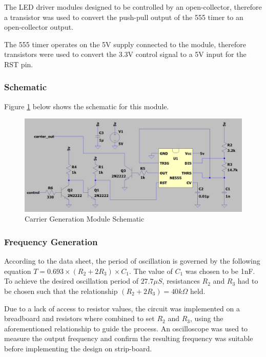 The LED driver modules designed to be controlled by an open-collector, therefore a transistor was used to convert the push-pull output of the 555 timer to an open-collector output.

The 555 timer operates on the 5V supply connected to the module, therefore transistors were used to convert the 3.3V control signal to a 5V input for the RST pin.

\subsubsection{Schematic}
Figure \ref{fig:schematic_carrier_generation} below shows the schematic for this module.

\begin{figure}[H]
	\centering
	\includegraphics[width=.8\textwidth]{figures/design/carrier_waveform_generator_555.JPG}
	\caption{Carrier Generation Module Schematic}
	\label{fig:schematic_carrier_generation}
\end{figure}

\subsubsection{Frequency Generation}

According to the data sheet, the period of oscillation is governed by the following equation \(T = 0.693\times (R_2 + 2R_3)\times C_1\). The value of $C_1$ was chosen to be 1nF. To achieve the desired oscillation period of $27.7\mu S$, resistances $R_2$ and $R_3$ had to be chosen such that the relationship $(R_2 + 2R_3) = 40k\Omega$ held.

Due to a lack of access to resistor values, the circuit was implemented on a breadboard and resistors where combined to set $R_2$ and $R_3$, using the aforementioned relationship to guide the process. An oscilloscope was used to measure the output frequency and confirm the resulting frequency was suitable before implementing the design on strip-board.

